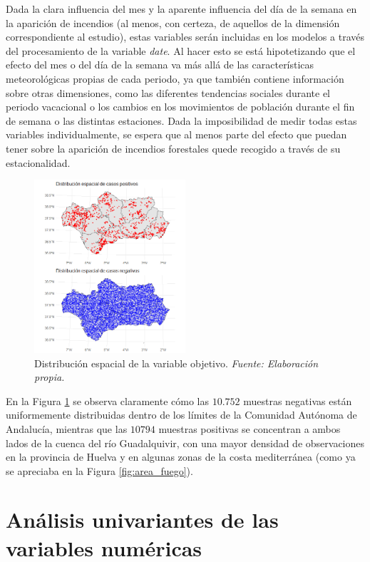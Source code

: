 \documentclass[12pt,a4paper,]{book}
\numberwithin{dummy}{section}
\theoremstyle{ocrenumbox}
\theoremstyle{blacknumex}
\theoremstyle{blacknumbox}
\theoremstyle{ocrenum}
\theoremstyle{ocrenum}
\begin{document}
Dada la clara influencia del mes y la aparente influencia del día de la
semana en la aparición de incendios (al menos, con certeza, de aquellos
de la dimensión correspondiente al estudio), estas variables serán
incluidas en los modelos a través del procesamiento de la variable
\emph{date}. Al hacer esto se está hipotetizando que el efecto del mes o
del día de la semana va más allá de las características meteorológicas
propias de cada periodo, ya que también contiene información sobre otras
dimensiones, como las diferentes tendencias sociales durante el periodo
vacacional o los cambios en los movimientos de población durante el fin
de semana o las distintas estaciones. Dada la imposibilidad de medir
todas estas variables individualmente, se espera que al menos parte del
efecto que puedan tener sobre la aparición de incendios forestales quede
recogido a través de su estacionalidad.

\begin{figure}[h]
\centering
\includegraphics[width = 0.5\textwidth]{graficos/distribucion_espacial_fire.png}
\caption[Distribución espacial de la variable objetivo]{Distribución espacial de la variable objetivo. \it Fuente: Elaboración propia.}
\label{fig:dist_spat_fire}
\end{figure}

En la Figura \ref{fig:dist_spat_fire} se observa claramente cómo las
\(10.752\) muestras negativas están uniformemente distribuidas dentro de
los límites de la Comunidad Autónoma de Andalucía, mientras que las
\(10794\) muestras positivas se concentran a ambos lados de la cuenca
del río Guadalquivir, con una mayor densidad de observaciones en la
provincia de Huelva y en algunas zonas de la costa mediterránea (como ya
se apreciaba en la Figura \ref{fig:area_fuego}).

\hypertarget{anuxe1lisis-univariantes-de-las-variables-numuxe9ricas}{%
\section{Análisis univariantes de las variables
numéricas}\label{anuxe1lisis-univariantes-de-las-variables-numuxe9ricas}}
\end{document}
